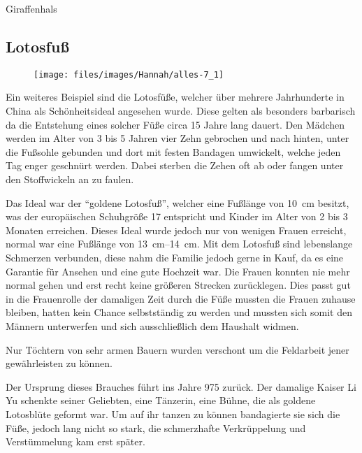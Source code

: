 \begin{figurewrapper} %
	 \hfill
	\caption{Giraffenhals}
\end{figurewrapper}

\subsection{Lotosfuß}

\begin{wrapfigure}{r}{0pt}
	\texttt{[image: files/images/Hannah/alles-7\_1]}%
\end{wrapfigure}
Ein weiteres Beispiel sind die Lotosfüße, welcher über
mehrere Jahrhunderte in China als Schönheitsideal angesehen wurde.
Diese gelten als besonders barbarisch da die Entstehung eines solcher Füße circa 15 Jahre lang dauert.
Den Mädchen werden im Alter von 3 bis 5 Jahren vier Zehn gebrochen und nach hinten, unter die
Fußsohle gebunden und dort mit festen Bandagen umwickelt, welche jeden Tag enger geschnürt werden.
Dabei sterben die Zehen oft ab oder fangen unter den Stoffwickeln an zu faulen.

Das Ideal war der \enquote{goldene Lotosfuß}, welcher eine Fußlänge von \SI{10}{\centi\metre} besitzt,
was der europäischen Schuhgröße 17 entspricht und Kinder im Alter von 2 bis 3 Monaten erreichen.
Dieses
Ideal wurde jedoch nur von wenigen Frauen erreicht, normal war eine Fußlänge von
\SIrange{13}{14}{\centi\metre}. Mit dem Lotosfuß sind lebenslange Schmerzen verbunden, diese nahm
die Familie jedoch gerne in Kauf, da es eine Garantie für Ansehen und eine gute Hochzeit war. Die
Frauen konnten nie mehr normal gehen und erst recht keine größeren Strecken zurücklegen. Dies passt
gut in die Frauenrolle der damaligen Zeit durch die Füße mussten die Frauen zuhause bleiben, hatten
kein Chance selbstständig zu werden und mussten sich somit den Männern unterwerfen und sich
ausschließlich dem Haushalt widmen.

Nur Töchtern von sehr armen Bauern wurden verschont um die Feldarbeit jener gewährleisten zu können.

Der Ursprung dieses Brauches führt ins Jahre 975 zurück. Der damalige Kaiser Li Yu schenkte seiner
Geliebten, eine Tänzerin, eine Bühne, die als goldene Lotosblüte geformt war. Um auf ihr tanzen
zu können bandagierte sie sich die Füße, jedoch lang nicht so stark, die schmerzhafte Verkrüppelung
und Verstümmelung kam erst später.

